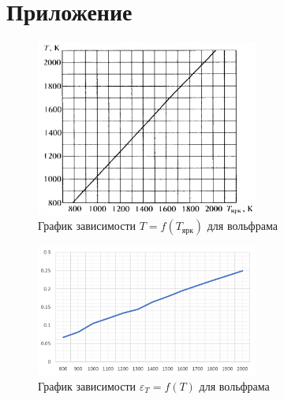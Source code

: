 \section{Приложение}

\begin{figure}[h]
    \centering
    \includegraphics[width=0.65\textwidth]{img/realtemp.PNG}
    \caption{График зависимости $T = f(T_\text{ярк})$ для вольфрама}
    \label{realtemp}
\end{figure}

\begin{figure}[h]
    \centering
    \includegraphics[width=0.65\textwidth]{img/corr.png}
    \caption{График зависимости $\varepsilon_T = f(T)$ для вольфрама}
    \label{corr}
\end{figure}